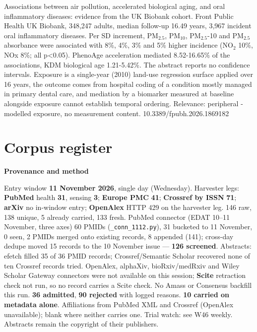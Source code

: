 \documentclass[10pt]{article}
\begin{document}
{Associations between air pollution, accelerated biological aging, and oral inflammatory diseases: evidence from the UK Biobank cohort.}
{Front Public Health}
{UK Biobank, 348,247 adults, median follow-up 16.49 years, 3,967 incident oral inflammatory diseases. Per SD increment, PM$_{2.5}$, PM$_{10}$, PM$_{2.5}$-10 and PM$_{2.5}$ absorbance were associated with 8\%, 4\%, 3\% and 5\% higher incidence (NO$_2$ 10\%, NOx 8\%; all p<0.05). PhenoAge acceleration mediated 8.52-16.65\% of the associations, KDM biological age 1.21-5.42\%. The abstract reports no confidence intervals. Exposure is a single-year (2010) land-use regression surface applied over 16 years, the outcome comes from hospital coding of a condition mostly managed in primary dental care, and mediation by a biomarker measured at baseline alongside exposure cannot establish temporal ordering. Relevance: peripheral - modelled exposure, no measurement content.}
{10.3389/fpubh.2026.1869182}

\clearpage
\section*{\sffamily\bfseries\color{Deep}Corpus register}
\vspace{-1.5mm}{\color{Amber}\rule{\linewidth}{1.1pt}}\vspace{2.5mm}



\vspace{2mm}

\begin{keybox}
{\sffamily\bfseries\footnotesize\color{Deep}Provenance and method}\\[1.2mm]
{\fontsize{7.2}{8.8}\selectfont
Entry window \textbf{11 November 2026}, single day (Wednesday). Harvester legs: \textbf{PubMed} health \textbf{31}, sensing \textbf{3}; \textbf{Europe PMC} \textbf{41}; \textbf{Crossref by ISSN} \textbf{71}; \textbf{arXiv} no in-window entry; \textbf{OpenAlex} HTTP 429 on the harvester leg. 146 raw, 138 unique, 5 already carried, 133 fresh. PubMed connector (EDAT 10--11 November, three axes) 60 PMIDs (\texttt{\_conn\_1112.py}), 31 bucketed to 11 November, 0 seen, 2 PMIDs merged onto existing records, 8 appended (141); cross-day dedupe moved 15 records to the 10 November issue --- \textbf{126 screened}. Abstracts: efetch filled 35 of 36 PMID records; Crossref/Semantic Scholar recovered none of ten Crossref records tried.
OpenAlex, alphaXiv, bioRxiv/medRxiv and Wiley Scholar Gateway connectors were not available on this session; \textbf{Scite} retraction check not run, so no record carries a Scite check. No Amass or Consensus backfill this run.
\textbf{36 admitted}, \textbf{90 rejected} with logged reasons. \textbf{10 carried on metadata alone}. Affiliations from PubMed XML and Crossref (OpenAlex unavailable); blank where neither carries one. Trial watch: see W46 weekly.
Abstracts remain the copyright of their publishers.\par}
\end{keybox}
\end{document}
